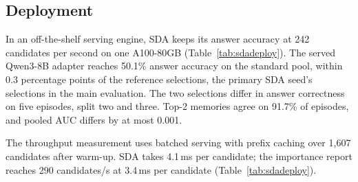 \subsection{Deployment}
\label{sec:deployment}

In an off-the-shelf serving engine, SDA keeps its answer accuracy at
242 candidates per second on one A100-80GB
(Table~\ref{tab:sdadeploy}). The served Qwen3-8B adapter reaches
50.1\% answer accuracy on the standard pool, within 0.3 percentage
points of the reference selections, the primary SDA seed's selections
in the main evaluation. The two selections differ in answer
correctness on five episodes, split two and three. Top-2 memories
agree on 91.7\% of episodes, and pooled AUC differs by at most 0.001.

The throughput measurement uses batched serving with prefix caching
over 1,607 candidates after warm-up. SDA takes 4.1\,ms per candidate;
the importance report reaches 290 candidates/s at 3.4\,ms per candidate
(Table~\ref{tab:sdadeploy}).


